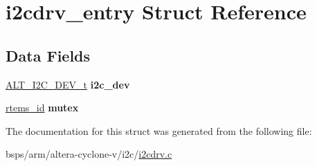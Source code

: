 \hypertarget{structi2cdrv__entry}{}\section{i2cdrv\+\_\+entry Struct Reference}
\label{structi2cdrv__entry}
\subsection*{Data Fields}
\begin{DoxyCompactItemize}
\item 
\mbox{\label{structi2cdrv__entry_a359464ba73fab9dbd59dd5aaf365368b}} 
\mbox{\hyperlink{structALT__I2C__DEV__s}{A\+L\+T\+\_\+\+I2\+C\+\_\+\+D\+E\+V\+\_\+t}} {\bfseries i2c\+\_\+dev}
\item 
\mbox{\label{structi2cdrv__entry_af769d5b2bd52bb1fd30d7b467b4e3cca}} 
\mbox{\hyperlink{group__ClassicTasks_gab20892b814dced7dd4e5b9bf42becd57}{rtems\+\_\+id}} {\bfseries mutex}
\end{DoxyCompactItemize}


The documentation for this struct was generated from the following file\+:\begin{DoxyCompactItemize}
\item 
bsps/arm/altera-\/cyclone-\/v/i2c/\mbox{\hyperlink{arm_2altera-cyclone-v_2i2c_2i2cdrv_8c}{i2cdrv.\+c}}\end{DoxyCompactItemize}
